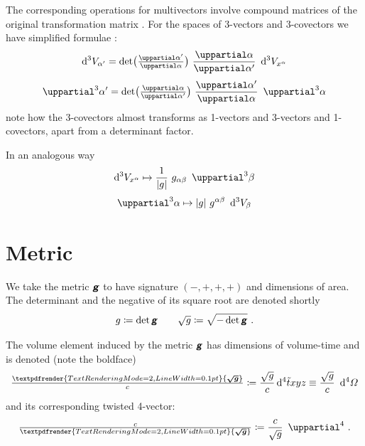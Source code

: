\documentclass[\ifafour a4paper,12pt,\else a5paper,10pt,\fi%
onecolumn,oneside,article,%
british%
]{memoir}
\theoremstyle{remark}
\theoremstyle{innote}
\newcommand*{\mathte}[1]{\textbf{\textit{\textsf{#1}}}}
\renewcommand*{\bm}[1]{\textpdfrender{TextRenderingMode=2,LineWidth=0.1pt}{\boldsymbol{#1}}}
\newcommand*{\de}{\mathop{}\!\uppartial}%
\newcommand*{\di}{\mathop{}\!\mathrm{d}}%
\newcommand*{\defd}{\coloneqq}
\DeclarePairedDelimiter\abs{\lvert}{\rvert}
\renewcommand*{\|}[1][]{\nonscript\:#1\vert\nonscript\:\mathopen{}}
\newcommand*{\sect}{\S}%
\newcommand*{\eqn}{eq.}%
\newcommand*{\ssssi}[1]{\di^{4}{#1}}
\newcommand*{\tw}[1]{\tilde{#1}}
\newcommand*{\ttte}[1]{\de^{3}{#1}}
\newcommand*{\tttte}[1]{\de^{4}{#1}}
\newcommand*{\ttti}[1]{\di^{3}V_{#1}}
\newcommand*{\tttti}[1]{\di^{4}\varOmega_{#1}}
\newcommand*{\yg}{\mathte{g}}
\newcommand*{\dg}{\sqrt{g}}
\newcommand*{\ve}{\tfrac{\bm{\sqrt{g}}}{c}}
\newcommand*{\vi}{\tfrac{c}{\bm{\sqrt{g}}}}
\begin{document}
The corresponding operations for multivectors involve {compound matrices} of the original transformation matrix \autocites[\sect~IV.A.1 p.~199]{choquetbruhatetal1977_r1996}. For the spaces of 3-vectors and 3-covectors we have simplified formulae \autocites[\sect~I.4 \eqn~(33)]{gantmacher1959_r2000}:
\begin{equation}
  \label{eq:transf3_simple}
  \begin{gathered}
    \ttti{\alpha'} =
    \det\bigl(
    \tfrac{\de \alpha'}{\de \alpha}
    \bigr)
    \ 
    \frac{\de \alpha}{\de \alpha'}
    \ 
    \ttti{x^{\alpha}}
    \\[\jot]
    \ttte{\alpha'} =
    \det\bigl(
    \tfrac{\de \alpha}{\de \alpha'}
    \bigr)
    \ 
    \frac{\de \alpha'}{\de \alpha}
    \ 
    \ttte{\alpha}
  \end{gathered}
\end{equation}
note how the 3-covectors almost transforms as 1-vectors and 3-vectors and 1-covectors, apart from a determinant factor.

In an analogous way
\begin{equation}
  \label{eq:raise3_simple}
  \begin{gathered}
    \ttti{x^{\alpha}}
    \mapsto
\frac{1}{\abs{g}}\ g_{\alpha\beta}\
    \ttte{\beta}
    \\[\jot]
    \ttte{\alpha}
    \mapsto
\abs{g}\ g^{\alpha\beta}\
    \ttti{\beta}
  \end{gathered}
\end{equation}


\section{Metric}
\label{sec:metric}

We take the metric $\yg$ to have signature $(-,+,+,+)$ and dimensions of area. The determinant and the negative of its square root are denoted shortly
\begin{equation}
  \label{eq:det_g}
  g\defd \det\yg
  \qquad
\dg \defd \sqrt{-\det\yg} \ .
\end{equation}

The volume element induced by the metric $\yg$ has dimensions of volume-time and is denoted (note the boldface)
\begin{equation}
  \label{eq:vol_element}
  \ve \defd \frac{\dg}{c} \ssssi{\tw{t}xyz} \equiv \frac{\dg}{c}\ \tttti{}
\end{equation}
and its corresponding twisted 4-vector:
\begin{equation}
  \label{eq:inv_vol_element}
  \vi \defd \frac{c}{\dg}\ \tttte{} \ .
\end{equation}
\end{document}
